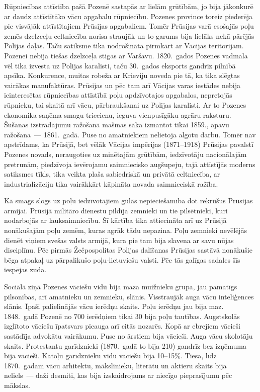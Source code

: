 \documentclass[twoside,a5paper,12pt,fleqn,openany]{extbook}
\newcommand{\asterism}{\vspace{1em}{\centering\Large\bfseries$\ast~\ast~\ast$\par}\vspace{1em}}
\begin{document}
Rūpniecības attīstība pašā Pozenē sastapās ar lielām grūtībām, jo bija jākonkurē ar daudz attīstītāko vācu apgabalu rūpniecību. Pozenes province toreiz piederēja pie visvājāk attīstītajiem Prūsijas apgabaliem. Tomēr Prūsijas varā esošajās poļu zemēs dzelzceļu celtniecība norisa straujāk un to garums bija lielāks nekā pārējās Polijas daļās. Taču satiksme tika nodrošināta pirmkārt ar Vācijas teritorijām. Pozenei nebija tiešas dzelzceļa stigas ar Varšavu. 1820.~gados Pozenes vadmala vēl tika izvesta uz Polijas karalisti, taču 30.~gados eksports gandrīz pilnībā apsīka. Konkurence, muitas robeža ar Krieviju noveda pie tā, ka tika slēgtas vairākas manufaktūras. Prūsijas un pēc tam arī Vācijas varas iestādes nebija ieinteresētas rūpniecības attīstībā poļu apdzīvotajos apgabalos, nepretojās rūpnieku, tai skaitā arī vācu, pārbraukšanai uz Polijas karalisti. Ar to Pozenes ekonomika saņēma smagu triecienu, ieguva vienpusīgāku agrāru raksturu. Šūšanas izstrādājumu ražošanā mašīnas sāka izmantot tikai 1859., apavu ražošana~--- 1861.~gadā. Puse no amatniekiem nelietoja algotu darbu. Tomēr nav apstrīdams, ka Prūsijā, bet vēlāk Vācijas impērijas (1871--1918) Prūsijas pavalstī Pozenes novads, neraugoties uz minētajām grūtībām, iedzīvotāju nacionālajām pretrunām, piedzīvoja ievērojamu saimniecisko augšupeju, tajā attīstījās moderns satiksmes tīkls, tika veikta plaša sabiedriskā un privātā celtniecība, ar industrializāciju tika vairākkārt kāpināta novada saimnieciskā ražība.

Kā smags slogs uz poļu iedzīvotājiem gūlās nepieciešamība dot rekrūšus Prūsijas armijai. Prūsijā militāro dienestu pildīja zemnieki un tie pilsētnieki, kuri nodarbojās ar lauksaimniecību. Šī kārtība tika attiecināta arī uz Prūsijā nonākušajām poļu zemēm, kuras agrāk tādu nepazina. Poļu zemnieki nevēlējās dienēt viņiem svešas valsts armijā, kura pie tam bija slavena ar savu nūjas disciplīnu. Pēc pirmās Žečpospolitas Polijas dalīšanas Prūsijas sastāvā nonākušie bēga atpakaļ uz pārpalikušo poļu-lietuviešu valsti. Pēc tās galīgas sadales šīs iespējas zuda.

\asterism

Sociālā ziņā Pozenes vāciešu vidū bija maza muižnieku grupa, jau pamatīgs pilsonības, arī amatnieku un zemnieku, slānis. Visstraujāk auga vācu inteliģences slānis. Īpaši palielinājās vācu ierēdņu skaits. Poļu ierēdņu jau bija maz. 1848.~gadā Pozenē no 700 ierēdņiem tikai 30 bija poļu tautības. Augstskolās izglītoto vāciešu īpatsvars pieauga arī citās nozarēs. Kopā ar ebrejiem vācieši sastādīja advokātu vairākumu. Puse no ārstiem bija vācieši. Auga vācu skolotāju skaits. Protestantu garīdznieki (1870.~gadā to bija 210) gandrīz bez izņēmuma bija vācieši. Katoļu garīdznieku vidū vāciešu bija 10--15\%. Tiesa, līdz 1870.~gadam vācu arhitektu, mākslinieku, literātu un aktieru skaits bija neliels~--- daži desmiti, kas bija izskaidrojams ar niecīgo pieprasījumu pēc mākslas.
\end{document}
